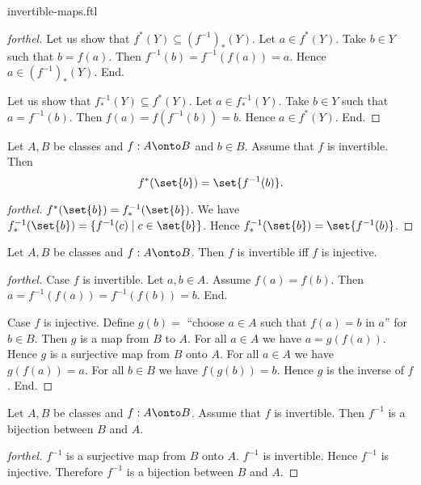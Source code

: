\documentclass{naproche-library}
\begin{document}
\begin{smodule}{invertible-maps.ftl}
\begin{proof}[forthel]
    Let us show that $f^{*}(Y) \subseteq (f^{-1})_{*}(Y)$.
      Let $a \in f^{*}(Y)$.
      Take $b \in Y$ such that $b = f(a)$.
      Then $f^{-1}(b) = f^{-1}(f(a)) = a$.
      Hence $a \in (f^{-1})_{*}(Y)$.
    End.

    Let us show that $f^{-1}_{*}(Y) \subseteq f^{*}(Y)$.
      Let $a \in f^{-1}_{*}(Y)$.
      Take $b \in Y$ such that $a = f^{-1}(b)$.
      Then $f(a) = f(f^{-1}(b)) = b$.
      Hence $a \in f^{*}(Y)$.
    End.
  \end{proof}

  \begin{corollary}[forthel,id=FOUNDATIONS_09_8607784268464128,printid]
    Let $A, B$ be classes and $f : A \onto B$ and $b \in B$.
    Assume that $f$ is invertible.
    Then \[ f^{*}(\set{b}) = \set{f^{-1}(b)}. \]
  \end{corollary}
  \begin{proof}[forthel]
    $f^{*}(\set{b}) = f^{-1}_{*}(\set{b})$.
    We have $f^{-1}_{*}(\set{b}) = \{ f^{-1}(c) \mid c \in \set{b} \}$.
    Hence $f^{-1}_{*}(\set{b}) = \set{f^{-1}(b)}$.
  \end{proof}

  \begin{proposition}[forthel,id=FOUNDATIONS_09_6777575974109184,printid]
    Let $A, B$ be classes and $f : A \onto B$.
    Then $f$ is invertible iff $f$ is injective.
  \end{proposition}
  \begin{proof}[forthel]
    Case $f$ is invertible.
      Let $a, b \in A$.
      Assume $f(a) = f(b)$.
      Then $a = f^{-1}(f(a)) = f^{-1}(f(b)) = b$.
    End.

    Case $f$ is injective.
      Define $g(b) =$ ``choose $a \in A$ such that $f(a) = b$ in $a$'' for
      $b \in B$.
      Then $g$ is a map from $B$ to $A$.
      For all $a \in A$ we have $a = g(f(a))$.
      Hence $g$ is a surjective map from $B$ onto $A$.
      For all $a \in A$ we have $g(f(a)) = a$.
      For all $b \in B$ we have $f(g(b)) = b$.
      Hence $g$ is the inverse of $f$.
    End.
  \end{proof}

  \begin{corollary}[forthel,id=FOUNDATIONS_09_5708971514003456,printid]
    Let $A, B$ be classes and $f : A \onto B$.
    Assume that $f$ is invertible.
    Then $f^{-1}$ is a bijection between $B$ and $A$.
  \end{corollary}
  \begin{proof}[forthel]
    $f^{-1}$ is a surjective map from $B$ onto $A$.
    $f^{-1}$ is invertible.
    Hence $f^{-1}$ is injective.
    Therefore $f^{-1}$ is a bijection between $B$ and $A$.
  \end{proof}



\end{smodule}
\end{document}
